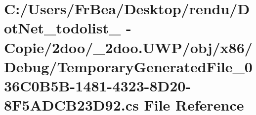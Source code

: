 \hypertarget{_u_w_p_2obj_2x86_2_debug_2_temporary_generated_file__036_c0_b5_b-1481-4323-8_d20-8_f5_a_d_c_b23_d92_8cs}{
\section{C:/Users/FrBea/Desktop/rendu/DotNet\_\-todolist\_ - Copie/2doo/\_\-2doo.UWP/obj/x86/Debug/TemporaryGeneratedFile\_\-036C0B5B-1481-4323-8D20-8F5ADCB23D92.cs File Reference}
\label{_u_w_p_2obj_2x86_2_debug_2_temporary_generated_file__036_c0_b5_b-1481-4323-8_d20-8_f5_a_d_c_b23_d92_8cs}
}
